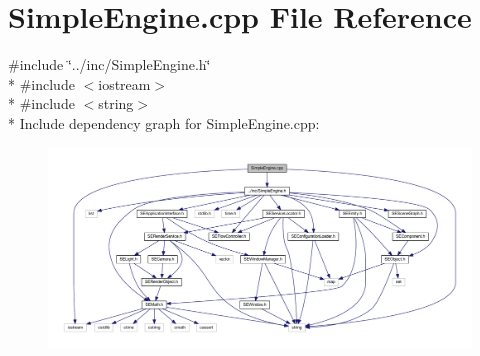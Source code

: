 \section{Simple\+Engine.\+cpp File Reference}
\label{_simple_engine_8cpp}
{\ttfamily \#include \char`\"{}../inc/\+Simple\+Engine.\+h\char`\"{}}\\*
{\ttfamily \#include $<$iostream$>$}\\*
{\ttfamily \#include $<$string$>$}\\*
Include dependency graph for Simple\+Engine.\+cpp\+:
\nopagebreak
\begin{figure}[H]
\begin{center}
\leavevmode
\includegraphics[width=350pt]{_simple_engine_8cpp__incl}
\end{center}
\end{figure}
